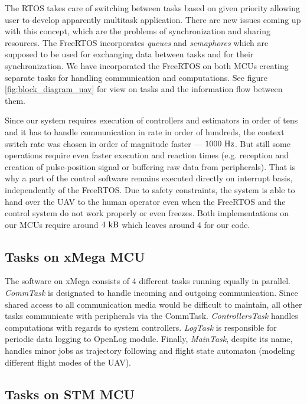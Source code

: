 The RTOS takes care of switching between tasks based on given priority allowing user to develop apparently multitask application. There are new issues coming up with this concept, which are the problems of synchronization and sharing resources. The FreeRTOS incorporates \textit{queues} and \textit{semaphores} which are supposed to be used for exchanging data between tasks and for their synchronization. We have incorporated the FreeRTOS on both MCUs creating separate tasks for handling communication and computations. See figure \ref{fig:block_diagram_uav} for view on tasks and the information flow between them.

Since our system requires execution of controllers and estimators in order of tens and it has to handle communication in rate in order of hundreds, the context switch rate was chosen in order of magnitude faster --- $1000~\mathrm{Hz}$. But still some operations require even faster execution and reaction times (e.g. reception and creation of pulse-position signal or buffering raw data from peripherals). That is why a part of the control software remains executed directly on interrupt basis, independently of the FreeRTOS. Due to safety constraints, the system is able to hand over the UAV to the human operator even when the FreeRTOS and the control system do not work properly or even freezes. Both implementations on our MCUs require around $4~\mathrm{kB}$ which leaves around 4 for our code.

\subsection{Tasks on xMega MCU}

The software on xMega consists of 4 different tasks running equally in parallel. \emph{CommTask} is designated to handle incoming and outgoing communication. Since shared access to all communication media would be difficult to maintain, all other tasks communicate with peripherals via the CommTask. \emph{ControllersTask} handles computations with regards to system controllers. \emph{LogTask} is responsible for periodic data logging to OpenLog module. Finally, \emph{MainTask}, despite its name, handles minor jobs as trajectory following and flight state automaton (modeling different flight modes of the UAV). 

\subsection{Tasks on STM MCU}


